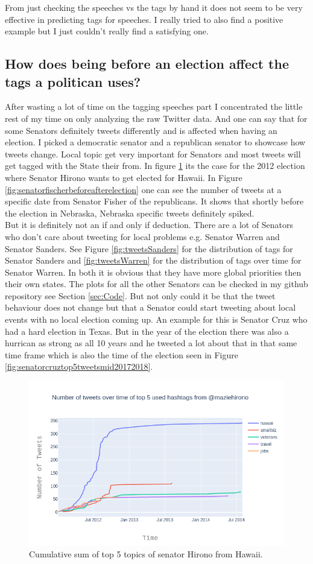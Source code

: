 \documentclass[10pt,conference,compsocconf]{IEEEtran}
\begin{document}
From just checking the speeches vs the tags by hand it does not seem to be very effective in predicting tags for speeches. 
I really tried to also find a positive example but I just couldn't really find a satisfying one.

 
\subsection{How does being before an election affect the tags a politican uses? }
After wasting a lot of time on the tagging speeches part I concentrated the little rest of my time on only analyzing the raw Twitter data. And one can say that for some Senators definitely tweets differently and is affected when having an election. I picked a democratic senator and a republican senator to showcase how tweets change. Local topic get very important for Senators and most tweets will get tagged with the State their from. In figure \ref{fig:hironobeforeafterelection} its the case for the 2012 election where Senator Hirono wants to get elected for Hawaii. In Figure \ref{fig:senatorfischerbeforeafterelection} one can see the number of tweets at a specific date from Senator Fisher of the republicans. It shows that shortly before the election in Nebraska, Nebraska specific tweets definitely spiked.\\
But it is definitely not an if and only if deduction. There are a lot of Senators who don't care about tweeting for local problems e.g. Senator Warren and Senator Sanders. See Figure \ref{fig:tweetsSanders} for the distribution of tags for Senator Sanders and \ref{fig:tweetsWarren} for the distribution of tags over time for Senator Warren. In both it is obvious that they have more global priorities then their own states. The plots for all the other Senators can be checked in my github repository see Section \ref{sec:Code}. But not only could it be that the tweet behaviour does not change but that a Senator could start tweeting about local events with no local election coming up. An example for this is Senator Cruz who had a hard election in Texas. But in the year of the election there was also a hurrican as strong as all 10 years and he tweeted a lot about that in that same time frame which is also the time of the election seen in Figure \ref{fig:senatorcruztop5tweetsmid20172018}.
 
\begin{figure}
	\centering
	\includegraphics[width=0.7\linewidth]{images/hirono_before_after_election}
	\caption{Cumulative sum of top 5 topics of senator Hirono from Hawaii. }
	\label{fig:hironobeforeafterelection}
\end{figure}
\end{document}
